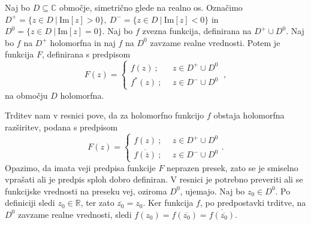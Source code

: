 \documentclass[mat1, tisk]{fmfdelo}
\begin{document}
    \begin{trditev}
        Naj bo $D \subseteq \mathbb{C}$ območje, simetrično glede na realno os. 
        Označimo $D^{+} = \{z \in D~|~\text{Im}[z] > 0\},~D^{-} = \{z \in D~|~\text{Im}[z] < 0\}$ in $D^{0} = \{z \in D~|~\text{Im}[z] = 0\}$.
        Naj bo $f$ zvezna funkcija, definirana na $D^{+} \cup D^0$. Naj bo $f$ na $D^{+}$ holomorfna in naj $f$ na $D^0$ zavzame realne vrednosti.
        Potem je funkcija $F$, definirana s predpisom
        $$
        F(z) = 
        \begin{cases}
            f(z)~;~~&z \in D^{+} \cup D^0\\
            f^*(z)~;~~&z \in D^{-} \cup D^0
        \end{cases}~,
        $$
        na območju $D$ holomorfna.
    \end{trditev}
    \begin{opomba}
        Trditev nam v resnici pove, da za holomorfno funkcijo $f$ obstaja holomorfna razširitev, podana s predpisom
        $$
        F(z) = 
        \begin{cases}
            f(z)~;~~&z \in D^{+} \cup D^0\\
            \overline{f(\overline{z})}~;~~&z \in D^{-} \cup D^0
        \end{cases}.
        $$
        Opazimo, da imata veji predpisa funkcije $F$ neprazen presek, zato se je smiselno vprašati ali je predpis sploh dobro definiran. V resnici je potrebno preveriti ali se funkcijske vrednosti na preseku vej, oziroma $D^0$, ujemajo.  
        Naj bo $z_0 \in D^0$. Po definiciji sledi $z_0 \in \mathbb{R}$, ter zato $\overline{z_0} = z_0$. Ker funkcija $f$, po predpostavki trditve, na $D^0$ zavzame realne vrednosti, sledi $f(z_0) = f(\overline{z_0}) = \overline{f(\overline{z_0})}$.
    \end{opomba}
\end{document}
